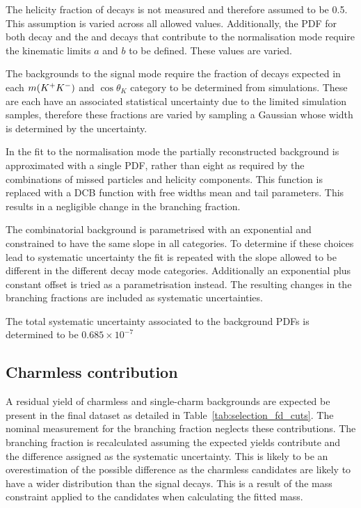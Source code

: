 The helicity fraction of \decay{\Bp}{\Dssp\phiz} decays is not measured and therefore assumed to be 0.5. This assumption is varied across all allowed values. Additionally, the PDF for both \decay{\Bp}{\Dssp\phiz} decay and the \decay{\Bp}{\Dssp\Dzb} and \decay{\Bp}{\Dsp\Dstarzb} decays that contribute to the normalisation mode require the kinematic limits $a$ and $b$ to be defined. These values are varied. 

The backgrounds to the signal mode require the fraction of decays expected in each $m({{K}^+}{{K}^-})$ and $\cos{\theta_{K}}$ category to be determined from simulations. These are each have an associated statistical uncertainty due to the limited simulation samples, therefore these fractions are varied by sampling a Gaussian whose width is determined by the uncertainty. 

In the fit to the normalisation mode the partially reconstructed background \decay{\Bp}{\Dssp\Dstarzb} is approximated with a single PDF, rather than eight as required by the combinations of missed particles and helicity components. This function is replaced with a DCB function with free widths mean and tail parameters. This results in a negligible change in the branching fraction. 

The combinatorial background is parametrised with an exponential and constrained to have the same slope in all categories. To determine if these choices lead to systematic uncertainty the fit is repeated with the slope allowed to be different in the different \Dsp decay mode categories. Additionally an exponential plus constant offset is tried as a parametrisation instead. The resulting changes in the branching fractions are included as systematic uncertainties.  

The total systematic uncertainty associated to the background PDFs is determined to be $0.685\times 10^{-7}$

\subsection{Charmless contribution}
A residual yield of charmless and single-charm backgrounds are expected be present in the final dataset as detailed in Table~\ref{tab:selection_fd_cuts}. The nominal measurement for the branching fraction neglects these contributions. The branching fraction is recalculated assuming the expected yields contribute and the difference assigned as the systematic uncertainty. This is likely to be an overestimation of the possible difference as the charmless candidates are likely to have a wider distribution than the signal decays. This is a result of the \Dsp mass constraint applied to the candidates when calculating the fitted \Bp mass. 

